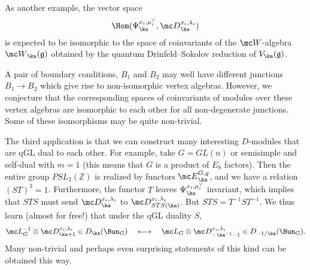 \documentclass[11pt,reqno]{amsart}
\theoremstyle{plain}
\numberwithin{equation}{section}
\newcommand{\Z}{\mathbb{Z}}
\newcommand{\g}{\mathfrak{g}}
\theoremstyle{definition}
\begin{document}
As another example, the vector space
\begin{equation}
\Hom(\Psi^{x_i, \mu^\vee_i}_{\ka}, {\mc D}_\ka^{x_i, \lambda_i})
\end{equation}
is expected to be isomorphic to the space of coinvariants of the ${\mc
  W}$-algebra ${\mc W}_\ka(\g)$ obtained by the quantum
Drinfeld--Sokolov reduction of $V_\ka(\mathfrak{g})$.

A pair of boundary conditions, $B_1$ and $B_2$ may well have different
junctions $B_1 \to B_2$ which give rise to non-isomorphic vertex
algebras. However, we conjecture that the corresponding spaces of
coinvariants of modules over these vertex algebras are isomorphic to
each other for all non-degenerate junctions. Some of these
isomorphisms may be quite non-trivial.

\medskip

The third application is that we can construct many interesting
$D$-modules that are qGL dual to each other. For example, take $G =
GL(n)$ or semisimple and self-dual with $m=1$ (this means that $G$ is
a product of $E_8$ factors). Then the entire group $PSL_2(\Z)$ is
realized by functors ${\mc E}^{G,g}_\ka$, and we have a relation
$(ST)^3=1$.  Furthermore, the functor $T$ leaves $\Psi^{x_i,
  \mu^\vee_i}_{\ka}$ invariant, which implies that $STS$ must send
${\mc D}_\ka^{x_i, \lambda_i}$ to ${\mc D}_{STS(\ka)}^{x_i,
  \lambda_i}$. But $STS = T^{-1} S T^{-1}$. We thus learn (almost for
free!) that under the qGL duality $S$,
\begin{equation}    \label{selfdual}
{\mc L}^{-1}_G \otimes {\mc D}_{\ka+1}^{x_i, \lambda_i} \in
D_\ka(\Bun_G) \quad \longleftrightarrow
\quad {\mc L}_G \otimes {\mc D}_{-\ka^{-1}-1}^{x_i,
  \lambda_i} \in D_{-1/\ka}(\Bun_G).
\end{equation}
Many non-trivial and perhaps even surprising statements of this kind
can be obtained this way.


\end{document}
